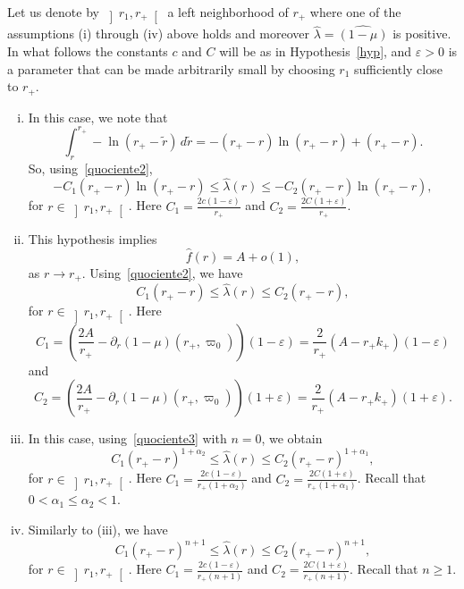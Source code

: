 \documentclass[a4paper,11pt,oneside,reqno]{amsart}
\newcommand{\kk}{k_+}
\newcommand{\eps}{\varepsilon}
\begin{document}
Let us denote by $\left]r_1,r_+\right[$ a left neighborhood of $r_+$ where one of the assumptions (i) through (iv) above holds and moreover $\hat{\lambda}=\widehat{(1-\mu)}$ is positive. In what follows the constants $c$ and $C$ will be as in Hypothesis~\ref{hyp}, and $\eps>0$ is a parameter that can be made arbitrarily small by choosing $r_1$ sufficiently close to $r_+$. 
\begin{enumerate}[(i)]
\item  
In this case, we note that
$$
\int_r^{r_+}-\ln(r_+-\tilde r)\,d\tilde r=-(r_+-r)\ln(r_+-r)+(r_+-r).
$$
So, using~\eqref{quociente2},
\begin{equation}\label{lambda-1}
-C_1(r_+-r)\ln(r_+-r)
\leq\hat{\lambda}(r)\leq -C_2(r_+-r)\ln(r_+-r),
\end{equation}
for $r \in \left]r_1,r_+\right[$. Here
$C_1=\frac{2c(1-\eps)}{r_+}$ and $C_2=\frac{2C(1+\eps)}{r_+}$.
\item This hypothesis implies
$$
\hat{f}(r)=A+o(1),
$$
as $r\to r_+$. Using~\eqref{quociente2}, we have
\begin{equation}\label{lambda-2}
C_1(r_+-r)\leq\hat \lambda(r)\leq C_2(r_+-r),
\end{equation}
for $r \in \left]r_1,r_+\right[$.
Here 
\begin{equation}\label{C1}
C_1=\left(\frac{2A}{r_+}-\partial_r(1-\mu)(r_+,\varpi_0)\right)(1-\eps)=\frac2{r_+}(A-r_+\kk)(1-\eps)
\end{equation}
and 
\begin{equation}\label{C2}
C_2=\left(\frac{2A}{r_+}-\partial_r(1-\mu)(r_+,\varpi_0)\right)(1+\eps)=\frac2{r_+}(A-r_+\kk)(1+\eps).
\end{equation}
\item In this case, using~\eqref{quociente3} with $n=0$, we obtain
\begin{equation}\label{lambda-3}
C_1(r_+-r)^{1+\alpha_2}
\leq\hat{\lambda}(r)\leq C_2(r_+-r)^{1+\alpha_1},
\end{equation}
for $r \in \left]r_1,r_+\right[$. Here
$C_1=\frac{2c(1-\eps)}{r_+(1+\alpha_2)}$ and $C_2=\frac{2C(1+\eps)}{r_+(1+\alpha_1)}$.
Recall that $0<\alpha_1\leq\alpha_2<1$.
\item Similarly to (iii), we have
\begin{equation}\label{lambda-6}
C_1(r_+-r)^{n+1}
\leq\hat{\lambda}(r)\leq C_2(r_+-r)^{n+1},
\end{equation}
for $r \in \left]r_1,r_+\right[$. Here
$C_1=\frac{2c(1-\eps)}{r_+(n+1)}$ and $C_2=\frac{2C(1+\eps)}{r_+(n+1)}$.
Recall that $n\geq 1$.
\end{enumerate}
\end{document}

